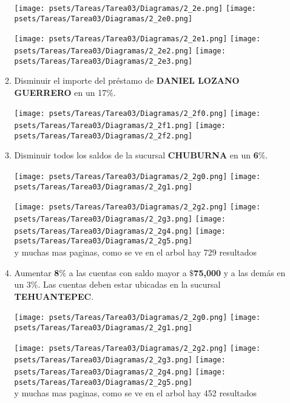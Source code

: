 \documentclass[10pt,letterpaper,fleqn]{article}
\begin{document}
\begin{enumerate}
\begin{enumerate}[a]
            \begin{center}
            \texttt{[image: psets/Tareas/Tarea03/Diagramas/2\_2e.png]}
            \texttt{[image: psets/Tareas/Tarea03/Diagramas/2\_2e0.png]}
            \end{center}
            \texttt{[image: psets/Tareas/Tarea03/Diagramas/2\_2e1.png]}
            \texttt{[image: psets/Tareas/Tarea03/Diagramas/2\_2e2.png]}
            \texttt{[image: psets/Tareas/Tarea03/Diagramas/2\_2e3.png]}
             
            \item Disminuir el importe del préstamo de \textbf{DANIEL LOZANO GUERRERO} en un 17$\%$.
            \begin{center}
            \texttt{[image: psets/Tareas/Tarea03/Diagramas/2\_2f0.png]}
            \texttt{[image: psets/Tareas/Tarea03/Diagramas/2\_2f1.png]}
            \texttt{[image: psets/Tareas/Tarea03/Diagramas/2\_2f2.png]}
            \end{center}
            \item Disminuir todos los saldos de la sucursal \textbf{CHUBURNA} en un \textbf{6}$\%$.
            \begin{center}
            \texttt{[image: psets/Tareas/Tarea03/Diagramas/2\_2g0.png]}
            \texttt{[image: psets/Tareas/Tarea03/Diagramas/2\_2g1.png]}
            \end{center}
            \texttt{[image: psets/Tareas/Tarea03/Diagramas/2\_2g2.png]}    
            \texttt{[image: psets/Tareas/Tarea03/Diagramas/2\_2g3.png]}
            \texttt{[image: psets/Tareas/Tarea03/Diagramas/2\_2g4.png]}   
            \texttt{[image: psets/Tareas/Tarea03/Diagramas/2\_2g5.png]} 
            \\y muchas mas paginas, como se ve en el arbol hay 729 resultados
            \item Aumentar \textbf{8}$\%$ a las cuentas con saldo mayor a $\$$\textbf{75,000} y a las demás en un 3$\%$. Las cuentas deben estar ubicadas en la sucursal \textbf{TEHUANTEPEC}.
            \begin{center}
            \texttt{[image: psets/Tareas/Tarea03/Diagramas/2\_2g0.png]}
            \texttt{[image: psets/Tareas/Tarea03/Diagramas/2\_2g1.png]}
            \end{center}
            \texttt{[image: psets/Tareas/Tarea03/Diagramas/2\_2g2.png]}    
            \texttt{[image: psets/Tareas/Tarea03/Diagramas/2\_2g3.png]}
            \texttt{[image: psets/Tareas/Tarea03/Diagramas/2\_2g4.png]}   
            \texttt{[image: psets/Tareas/Tarea03/Diagramas/2\_2g5.png]} 
            \\y muchas mas paginas, como se ve en el arbol hay 452 resultados
        \end{enumerate}
    \end{enumerate}
\end{document}
